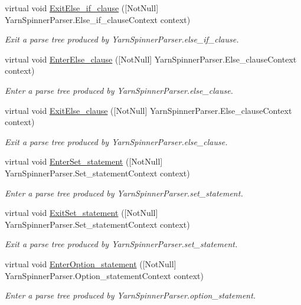 \begin{DoxyCompactItemize}
virtual void \hyperlink{a00190_a071da0b364f87cb542e2e3dff5d9f9c4}{Exit\-Else\-\_\-if\-\_\-clause} (\mbox{[}Not\-Null\mbox{]} Yarn\-Spinner\-Parser.\-Else\-\_\-if\-\_\-clause\-Context context)
\begin{DoxyCompactList}\small\item\em Exit a parse tree produced by Yarn\-Spinner\-Parser.\-else\-\_\-if\-\_\-clause. \end{DoxyCompactList}\item 
virtual void \hyperlink{a00190_a571719b5e04b3e980ab2a05cd2c44989}{Enter\-Else\-\_\-clause} (\mbox{[}Not\-Null\mbox{]} Yarn\-Spinner\-Parser.\-Else\-\_\-clause\-Context context)
\begin{DoxyCompactList}\small\item\em Enter a parse tree produced by Yarn\-Spinner\-Parser.\-else\-\_\-clause. \end{DoxyCompactList}\item 
virtual void \hyperlink{a00190_a2dcc21a150bdc508c49e81bd10b6964f}{Exit\-Else\-\_\-clause} (\mbox{[}Not\-Null\mbox{]} Yarn\-Spinner\-Parser.\-Else\-\_\-clause\-Context context)
\begin{DoxyCompactList}\small\item\em Exit a parse tree produced by Yarn\-Spinner\-Parser.\-else\-\_\-clause. \end{DoxyCompactList}\item 
virtual void \hyperlink{a00190_aad83c1dbc65e88ec66978ffc6fe96a5f}{Enter\-Set\-\_\-statement} (\mbox{[}Not\-Null\mbox{]} Yarn\-Spinner\-Parser.\-Set\-\_\-statement\-Context context)
\begin{DoxyCompactList}\small\item\em Enter a parse tree produced by Yarn\-Spinner\-Parser.\-set\-\_\-statement. \end{DoxyCompactList}\item 
virtual void \hyperlink{a00190_a32a780332df7d7104f4816995e3f4970}{Exit\-Set\-\_\-statement} (\mbox{[}Not\-Null\mbox{]} Yarn\-Spinner\-Parser.\-Set\-\_\-statement\-Context context)
\begin{DoxyCompactList}\small\item\em Exit a parse tree produced by Yarn\-Spinner\-Parser.\-set\-\_\-statement. \end{DoxyCompactList}\item 
virtual void \hyperlink{a00190_a2d0f9144a167601309e785868bc9c4cb}{Enter\-Option\-\_\-statement} (\mbox{[}Not\-Null\mbox{]} Yarn\-Spinner\-Parser.\-Option\-\_\-statement\-Context context)
\begin{DoxyCompactList}\small\item\em Enter a parse tree produced by Yarn\-Spinner\-Parser.\-option\-\_\-statement. \end{DoxyCompactList}\item 

\end{DoxyCompactItemize}
